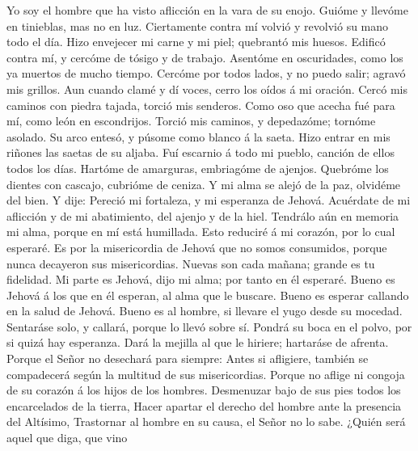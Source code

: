  Yo soy el hombre que ha visto aflicción en la vara de su
enojo.  Guióme y llevóme en tinieblas, mas no en luz.
 Ciertamente contra mí volvió y revolvió su mano todo el
día.  Hizo envejecer mi carne y mi piel; quebrantó mis
huesos.  Edificó contra mí, y cercóme de tósigo y de
trabajo.  Asentóme en oscuridades, como los ya muertos de
mucho tiempo.  Cercóme por todos lados, y no puedo salir;
agravó mis grillos.  Aun cuando clamé y dí voces, cerro los
oídos á mi oración.  Cercó mis caminos con piedra tajada,
torció mis senderos.  Como oso que acecha fué para mí, como
león en escondrijos.  Torció mis caminos, y depedazóme;
tornóme asolado.  Su arco entesó, y púsome como blanco á la
saeta.  Hizo entrar en mis riñones las saetas de su aljaba.
 Fuí escarnio á todo mi pueblo, canción de ellos todos los
días.  Hartóme de amarguras, embriagóme de ajenjos.
 Quebróme los dientes con cascajo, cubrióme de ceniza.
 Y mi alma se alejó de la paz, olvidéme del bien.
 Y dije: Pereció mi fortaleza, y mi esperanza de Jehová.
 Acuérdate de mi aflicción y de mi abatimiento, del ajenjo
y de la hiel.  Tendrálo aún en memoria mi alma, porque en
mí está humillada.  Esto reduciré á mi corazón, por lo cual
esperaré.  Es por la misericordia de Jehová que no somos
consumidos, porque nunca decayeron sus misericordias. 
Nuevas son cada mañana; grande es tu fidelidad.  Mi parte
es Jehová, dijo mi alma; por tanto en él esperaré.  Bueno
es Jehová á los que en él esperan, al alma que le buscare. 
Bueno es esperar callando en la salud de Jehová.  Bueno es
al hombre, si llevare el yugo desde su mocedad.  Sentaráse
solo, y callará, porque lo llevó sobre sí.  Pondrá su boca
en el polvo, por si quizá hay esperanza.  Dará la mejilla
al que le hiriere; hartaráse de afrenta.  Porque el Señor
no desechará para siempre:  Antes si afligiere, también se
compadecerá según la multitud de sus misericordias.  Porque
no aflige ni congoja de su corazón á los hijos de los hombres.
 Desmenuzar bajo de sus pies todos los encarcelados de la
tierra,  Hacer apartar el derecho del hombre ante la
presencia del Altísimo,  Trastornar al hombre en su causa,
el Señor no lo sabe.  ¿Quién será aquel que diga, que vino
